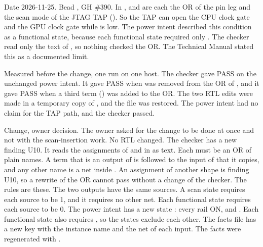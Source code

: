 \begin{record}

Date 2026-11-25. Bead , GH \#390. In ,  and  are each the OR of the pin leg and the scan mode of the JTAG TAP (). So the TAP can open the CPU clock gate and the GPU clock gate while  is low. The power intent described this condition as a functional state, because each functional state required only . The checker  read only the text of , so nothing checked the OR. The Technical Manual stated this as a documented limit.

\end{record}

\begin{record}

Measured before the change, one run on one host. The checker gave PASS on the unchanged power intent. It gave PASS when  was removed from the OR of , and it gave PASS when a third term () was added to the OR. The two RTL edits were made in a temporary copy of , and the file was restored. The power intent had no claim for the TAP path, and the checker passed.

\end{record}

\begin{record}

Change, owner decision. The owner asked for the change to be done at once and not with the scan-insertion work. No RTL changed. The checker has a new finding U10. It reads the assignments of  and  in  as text. Each must be an OR of plain names. A term that is an output of  is followed to the input of  that it copies, and any other name is a net inside . An assignment of another shape is finding U10, so a rewrite of the OR cannot pass without a change of the checker. The rules are these. The two outputs have the same sources. A scan state requires each source to be 1, and it requires no other net. Each functional state requires each source to be 0. The power intent has a new state : every rail ON,  and . Each functional state also requires , so the states exclude each other. The facts file has a new key  with the instance name and the net of each input. The facts were regenerated with .

\end{record}

